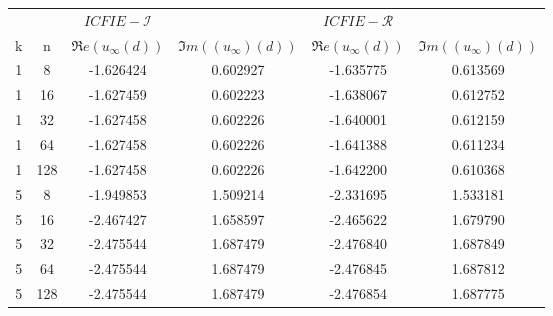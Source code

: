 \begin{tabular}{|cc|cc|cc|}\hline 
 & & $ICFIE-\mathcal{I}$& &$ICFIE-\mathcal{R}$ & \\k &  n & $\Re{e}\left(u_\infty(d)\right)$ & $\Im{m}\left((u_\infty)(d)\right)$ & $\Re{e}\left(u_\infty(d)\right)$ & $\Im{m}\left((u_\infty)(d)\right)$ \\ \hline 
1 & 8 & -1.626424 & 0.602927 & -1.635775 & 0.613569 \\ 
\hline 
1 & 16 & -1.627459 & 0.602223 & -1.638067 & 0.612752 \\ 
\hline 
1 & 32 & -1.627458 & 0.602226 & -1.640001 & 0.612159 \\ 
\hline 
1 & 64 & -1.627458 & 0.602226 & -1.641388 & 0.611234 \\ 
\hline 
1 & 128 & -1.627458 & 0.602226 & -1.642200 & 0.610368 \\ 
\hline 
5 & 8 & -1.949853 & 1.509214 & -2.331695 & 1.533181 \\ 
\hline 
5 & 16 & -2.467427 & 1.658597 & -2.465622 & 1.679790 \\ 
\hline 
5 & 32 & -2.475544 & 1.687479 & -2.476840 & 1.687849 \\ 
\hline 
5 & 64 & -2.475544 & 1.687479 & -2.476845 & 1.687812 \\ 
\hline 
5 & 128 & -2.475544 & 1.687479 & -2.476854 & 1.687775 \\ 
\hline 
\end{tabular}
